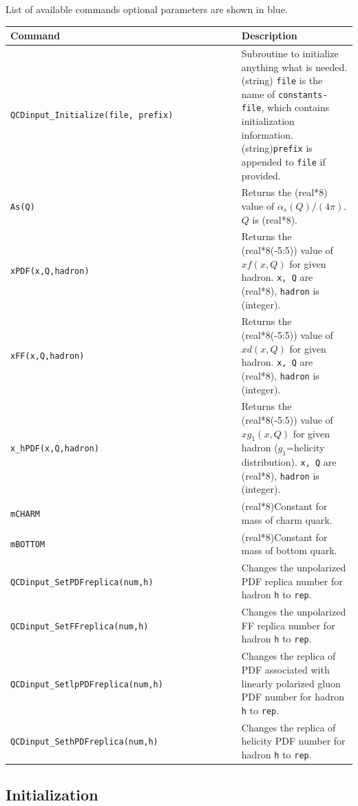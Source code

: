\documentclass[prd,nofootinbib,eqsecnum,final]{revtex4}
\renewcommand{\(}{\left(}
\renewcommand{\)}{\right)}
\renewcommand{\[}{\left[}
\renewcommand{\]}{\right]}
\newcommand{\blue}[1]{{\color{blue} #1}}
\begin{document}
\begin{center}
List of available commands \blue{optional parameters are shown in blue.}
\\
\begin{tabular}{||l|p{10cm}||}
\hline\hline
Command~~~~~~~~~~~~~~~~~~~~~~~~~~~~~~~ & Description
\\\hline
\texttt{QCDinput{\_}Initialize(file,\blue{prefix})} & Subroutine to initialize anything what is needed. (string) \texttt{file} is the name of \texttt{constants-file}, which contains initialization information. (string)\texttt{prefix} is appended to \texttt{file} if provided.
\\\hline
\texttt{As(Q)} &  Returns the (real*8) value of $\alpha_s(Q)/(4\pi)$. $Q$ is (real*8).
\\\hline
\texttt{xPDF(x,Q,hadron)} &  Returns the (real*8(-5:5)) value of $xf(x,Q)$ for given hadron. \texttt{x, Q} are (real*8), \texttt{hadron} is (integer).
\\\hline
\texttt{xFF(x,Q,hadron)} &  Returns the (real*8(-5:5)) value of $xd(x,Q)$ for given hadron. \texttt{x, Q} are (real*8), \texttt{hadron} is (integer).
\\\hline
\texttt{x\_hPDF(x,Q,hadron)} &  Returns the (real*8(-5:5)) value of $xg_1(x,Q)$ for given hadron ($g_1$=helicity distribution). \texttt{x, Q} are (real*8), \texttt{hadron} is (integer).
\\\hline
\texttt{mCHARM} &  (real*8)Constant for mass of charm quark.
\\\hline
\texttt{mBOTTOM} &  (real*8)Constant for mass of bottom quark.
\\\hline\hline
\texttt{QCDinput\_SetPDFreplica(num,h)} & Changes the unpolarized PDF replica number for hadron \texttt{h} to \texttt{rep}.
\\\hline
\texttt{QCDinput\_SetFFreplica(num,h)} & Changes the unpolarized FF replica number for hadron \texttt{h} to \texttt{rep}.
\\\hline
\texttt{QCDinput\_SetlpPDFreplica(num,h)} & Changes the replica of PDF associated with linearly polarized gluon PDF number for hadron \texttt{h} to \texttt{rep}.
\\\hline
\texttt{QCDinput\_SethPDFreplica(num,h)} & Changes the replica of helicity PDF number for hadron \texttt{h} to \texttt{rep}.
\\\hline\hline
\end{tabular}
\end{center}

\subsection{Initialization}
\label{sec:QCDinput_ini}
\end{document}
